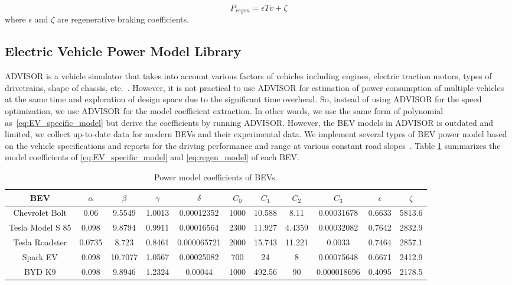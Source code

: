 \documentclass{IEEEtran}
\begin{document}
\begin{equation}\label{eq:regen_model} 
P_{regen} = \epsilon T v + \zeta
\end{equation}  %
where $\epsilon$ and $\zeta$ are regenerative braking coefficients.

\subsection{Electric Vehicle Power Model Library}

ADVISOR is a vehicle simulator that takes into account various factors of vehicles including engines, electric traction motors, types of drivetrains, shape of chassis, etc.~\cite{Markel:JPS02}. 
However, it is not practical to use ADVISOR for estimation of power consumption of multiple vehicles at the same time and exploration of design space due to the significant time overhead. 
So, instead of using ADVISOR for the speed optimization, we use ADVISOR for the model coefficient extraction. 
In other words, we use the same form of polynomial as~\eqref{eq:EV_specific_model} but derive the coefficients by running ADVISOR. However, the BEV models in ADVISOR is outdated and limited, we collect up-to-date data for modern BEVs and their experimental data.
We implement several types of BEV power model based on the vehicle specifications and reports for the driving performance and range at various constant road slopes~\cite{GM_Bolt:official,Tesla_ModelS:official,GM_Spark:official,BYD_K9:official,Tesla_Roadster:official}. 
Table \ref{table:Coeff_EVs} summarizes the model coefficients of \eqref{eq:EV_specific_model} and \eqref{eq:regen_model} of each BEV. 

\begin{table} 	%
\centering
\small
\caption{Power model coefficients of BEVs.}
\label{table:Coeff_EVs}
\begin{tabular}{|c|c|c|c|c|c|c|c|c|c|c|} \hline

BEV 		 	&$\alpha$	&$\beta$	&$\gamma$	&$\delta$		&$C_0$	&$C_1$	&$C_2$	&$C_3$		&$\epsilon$	&$\zeta$ \\ \hline

Chevrolet Bolt	&0.06	&9.5549	&1.0013		&0.00012352	&1000	&10.588	&8.11	&0.00031678	&0.6633		&5813.6 \\ \hline

Tesla Model S 85 &0.098	&9.8794	&0.9911		&0.00016564	&2300	&11.927	&4.4359	&0.00032082	& 0.7642		&2832.9 \\ \hline

Tesla Roadster	&0.0735	&8.723	&0.8461		&0.000065721	&2000	&15.743	&11.221	&0.0033		&0.7464		&2857.1 \\ \hline

Spark EV		&0.098	&10.7077	&1.0567		&0.00025082	&700		&24		&8	&0.00075648	&0.6671		&2412.9 \\ \hline

BYD K9		&0.098	&9.8946	&1.2324		&0.00044		&1000	&492.56	&90	&0.000018696	&0.4095		&2178.5 \\ \hline

\end{tabular}
\end{table}
\end{document}
